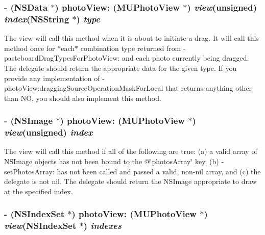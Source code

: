 \subsubsection{\setlength{\rightskip}{0pt plus 5cm}- (NSData $\ast$) photo\-View: ({\bf MUPhoto\-View} $\ast$) {\em view}(unsigned) {\em index}(NSString $\ast$) {\em type}}\label{category_n_s_object(_m_u_photo_view_delegate)_6087d843615018dd2c384958fc5efd09}


The view will call this method when it is about to initiate a drag. It will call this method once for $\ast$each$\ast$ combination type returned from -pasteboard\-Drag\-Types\-For\-Photo\-View: and each photo currently being dragged. The delegate should return the appropriate data for the given type. If you provide any implementation of -photo\-View:dragging\-Source\-Operation\-Mask\-For\-Local that returns anything other than NO, you should also implement this method. 
\subsubsection{\setlength{\rightskip}{0pt plus 5cm}- (NSImage $\ast$) photo\-View: ({\bf MUPhoto\-View} $\ast$) {\em view}(unsigned) {\em index}}\label{category_n_s_object(_m_u_photo_view_delegate)_f29adaf349861b6ab7c2b427114ab73d}


The view will call this method if all of the following are true: (a) a valid array of NSImage objects has not been bound to the @\char`\"{}photos\-Array\char`\"{} key, (b) -set\-Photos\-Array: has not been called and passed a valid, non-nil array, and (c) the delegate is not nil. The delegate should return the NSImage appropriate to draw at the specified index. 
\subsubsection{\setlength{\rightskip}{0pt plus 5cm}- (NSIndex\-Set $\ast$) photo\-View: ({\bf MUPhoto\-View} $\ast$) {\em view}(NSIndex\-Set $\ast$) {\em indexes}}\label{category_n_s_object(_m_u_photo_view_delegate)_cc75f4ee5d3ecd0c2c37c0b26f6bf08c}


